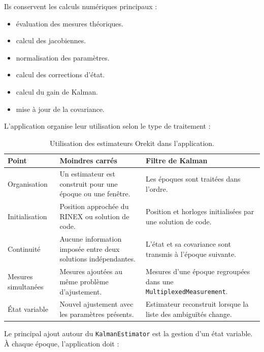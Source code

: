 Ils conservent les calculs numériques principaux :

\begin{itemize}
    \item évaluation des mesures théoriques.
    \item calcul des jacobiennes.
    \item normalisation des paramètres.
    \item calcul des corrections d'état.
    \item calcul du gain de Kalman.
    \item mise à jour de la covariance.
\end{itemize}

L'application organise leur utilisation selon le type de traitement :

\begin{table}[htbp]
\centering
\small
\begin{tabularx}{\textwidth}{|>{\raggedright\arraybackslash}p{}|
                                  >{\raggedright\arraybackslash}p{}|
                                  >{\raggedright\arraybackslash}X|}
\hline
\textbf{Point} & \textbf{Moindres carrés} & \textbf{Filtre de Kalman} \\
\hline
Organisation & Un estimateur est construit pour une époque ou une fenêtre. &
Les époques sont traitées dans l'ordre. \\
\hline
Initialisation & Position approchée du RINEX ou solution de code. & Position et
horloges initialisées par une solution de code. \\
\hline
Continuité & Aucune information imposée entre deux solutions indépendantes. &
L'état et sa covariance sont transmis à l'époque suivante. \\
\hline
Mesures simultanées & Mesures ajoutées au même problème d'ajustement. & Mesures
d'une époque regroupées dans une \texttt{MultiplexedMeasurement}. \\
\hline
État variable & Nouvel ajustement avec les paramètres présents. & Estimateur
reconstruit lorsque la liste des ambiguïtés change. \\
\hline
\end{tabularx}
\caption{Utilisation des estimateurs Orekit dans l'application.}
\label{tab:orekit_estimator_adaptation}
\end{table}

Le principal ajout autour du \texttt{KalmanEstimator} est la gestion d'un état
variable. À chaque époque, l'application doit :

